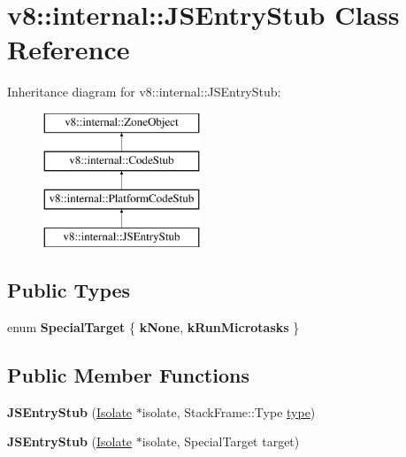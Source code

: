 \hypertarget{classv8_1_1internal_1_1JSEntryStub}{}\section{v8\+:\+:internal\+:\+:J\+S\+Entry\+Stub Class Reference}
\label{classv8_1_1internal_1_1JSEntryStub}
Inheritance diagram for v8\+:\+:internal\+:\+:J\+S\+Entry\+Stub\+:\begin{figure}[H]
\begin{center}
\leavevmode
\includegraphics[height=4.000000cm]{classv8_1_1internal_1_1JSEntryStub}
\end{center}
\end{figure}
\subsection*{Public Types}
\begin{DoxyCompactItemize}
\item 
\mbox{\label{classv8_1_1internal_1_1JSEntryStub_ad65c710de33ddbfd303c400f866a0620}} 
enum {\bfseries Special\+Target} \{ {\bfseries k\+None}, 
{\bfseries k\+Run\+Microtasks}
 \}
\end{DoxyCompactItemize}
\subsection*{Public Member Functions}
\begin{DoxyCompactItemize}
\item 
\mbox{\label{classv8_1_1internal_1_1JSEntryStub_a50918ea2c1651461b2d0dbead7370536}} 
{\bfseries J\+S\+Entry\+Stub} (\mbox{\hyperlink{classv8_1_1internal_1_1Isolate}{Isolate}} $\ast$isolate, Stack\+Frame\+::\+Type \mbox{\hyperlink{classstd_1_1conditional_1_1type}{type}})
\item 
\mbox{\label{classv8_1_1internal_1_1JSEntryStub_abe54cca9b2e3f8d56079895eef02bdd9}} 
{\bfseries J\+S\+Entry\+Stub} (\mbox{\hyperlink{classv8_1_1internal_1_1Isolate}{Isolate}} $\ast$isolate, Special\+Target target)
\end{DoxyCompactItemize}

